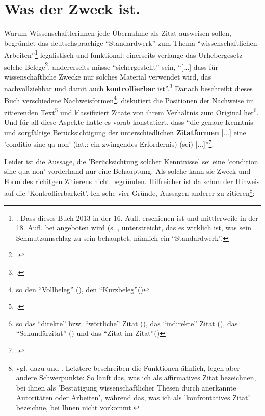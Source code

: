 
\section{Was der Zweck ist.}

Warum Wissenschaftlerinnen jede Übernahme als Zitat ausweisen sollen, begründet das deutschsprachige \enquote{Standardwerk} zum Thema \enquote{wissenschaftlichen Arbeiten}\footnote{\cite[vgl.][S. 159ff]{Theisen2013a}. Dass dieses Buch 2013 in der 16. Aufl. erschienen ist und mittlerweile in der 18. Aufl. bei angeboten wird (s. , unterstreicht, das es wirklich ist, was sein Schmutzumschlag zu sein behauptet, nämlich ein \enquote{Standardwerk}.} legalistisch und funktional: einerseits verlange das Urhebergesetz solche Belege\footcite[vgl.][159]{Theisen2013a}, andererseits müsse \enquote{sichergestellt} sein, \enquote{[...] dass für wissenschaftliche Zwecke nur solches Material verwendet wird, das nachvollziehbar und damit auch \textbf{kontrollierbar} ist}.\footcite[vgl.][160]{Theisen2013a} Danach beschreibt dieses Buch verschiedene Nachweisformen\footnote{so den \enquote{Vollbeleg} (\cite[vgl.][S. 161f]{Theisen2013a}), den \enquote{Kurzbeleg}(\cite[vgl.][S. 163f]{Theisen2013a})}, diskutiert die Positionen der Nachweise im zitierenden Text\footcite[vgl.][S. 166ff]{Theisen2013a} und klassifiziert Zitate von ihrem Verhältnis zum Original her\footnote{so das \enquote{direkte} bzw. \enquote{wörtliche} Zitat (\cite[vgl.][S. 169ff]{Theisen2013a}), das \enquote{indirekte} Zitat (\cite[vgl.][S. 174ff]{Theisen2013a}), das \enquote{Sekundärzitat}  (\cite[vgl.][S. 177f]{Theisen2013a}) und das \enquote{Zitat im Zitat}(\cite[vgl.][179]{Theisen2013a})}. Und für all diese Aspekte hatte es vorab konstatiert, dass \enquote{die genaue Kenntnis und sorgfältige Berücksichtigung der unterschiedlichen \textbf{Zitatformen} [...] eine 'conditio sine qa non' (lat.: ein zwingendes Erfordernis) (sei) [...]}\footcite[vgl.][S. 159 {herv. u. übers. i.O.}]{Theisen2013a}.

Leider ist die Aussage, die 'Berücksichtung solcher Kenntnisse' sei eine 'condition sine qua non' vorderhand nur eine Behauptung. Als solche kann sie Zweck und Form des richitgen Zitierens nicht begründen. Hilfreicher ist da schon der Hinweis auf die 'Kontrollierbarkeit'. Ich sehe vier Gründe, Aussagen anderer zu zitieren\footnote{vgl. dazu \cite[][52]{ModLanAss2009a} und \cite[][187]{RueStaFra1980a}. Letztere beschreiben die Funktionen ähnlich, legen aber andere Schwer\-punk\-te: So läuft das, was ich als affirmatives Zitat bezeichnen, bei ihnen als 'Bestätigung wissenschaftlicher Thesen durch anerkannte Autoritäten oder Arbeiten', während das, was ich als 'konfrontatives Zitat' bezeichne, bei Ihnen nicht vorkommt.}:

